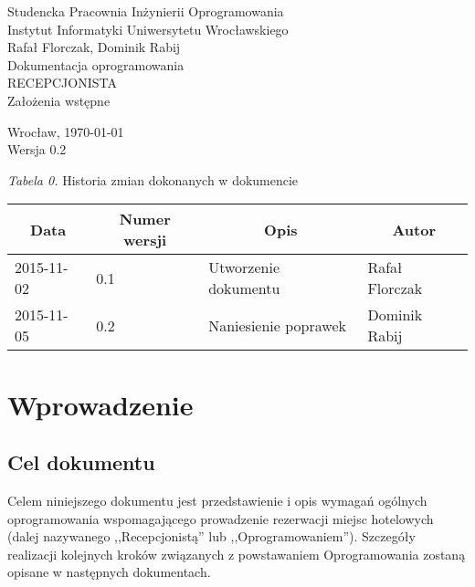\documentclass [11pt, a4paper, leqno] {article}
\begin{document}

\begin{center}
  \thispagestyle{empty} %
  {\large Studencka Pracownia Inżynierii Oprogramowania} \\ [0.5cm]
	{\large Instytut Informatyki Uniwersytetu Wrocławskiego} \\ [6.0cm]

  {\large Rafał Florczak, Dominik Rabij} \\ [1.5cm]

	{\huge Dokumentacja oprogramowania} \\ [0.5cm]
  {\huge RECEPCJONISTA} \\ [1.5cm]

  {\large Założenia wstępne} \\ [0.5cm]

  \vfill
  
  {\large Wrocław, \today} \\ [0.5cm]
  {\large Wersja 0.2}
\end{center}

\newpage


\textit{Tabela 0.} Historia zmian dokonanych w dokumencie

\begin{center}
  \begin{tabular}{| l | l | l | l |}
    \hline
    \multicolumn{1}{|c|}{Data} & 
    \multicolumn{1}{|c|}{Numer wersji} &  
    \multicolumn{1}{|c|}{Opis} &
    \multicolumn{1}{|c|}{Autor} \\ \hline \hline
    2015-11-02 & 0.1 & Utworzenie dokumentu & Rafał Florczak \\ \hline
    2015-11-05 & 0.2 & Naniesienie poprawek & Dominik Rabij\\ \hline
  \end{tabular}
\end{center}

\medskip

\tableofcontents

\newpage

\section{Wprowadzenie}

\subsection{Cel dokumentu}
\noindent
Celem niniejszego dokumentu jest przedstawienie i opis wymagań ogólnych oprogramowania wspomagającego prowadzenie rezerwacji miejsc hotelowych (dalej nazywanego ,,Recepcjonistą'' lub ,,Oprogramowaniem''). Szczegóły realizacji kolejnych kroków związanych z powstawaniem Oprogramowania zostaną opisane w następnych dokumentach.
\end{document}
